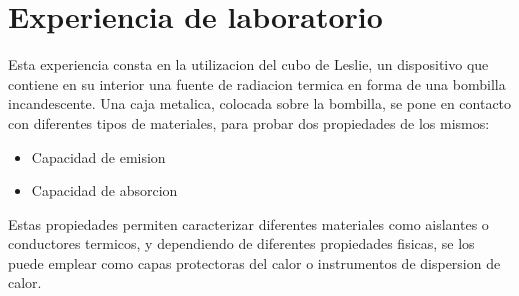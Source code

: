 \documentclass[12pt]{report}
\begin{document}
\chapter{Experiencia de laboratorio}
  Esta experiencia consta en la utilizacion del cubo de Leslie, un dispositivo que contiene en su interior una fuente
  de radiacion termica en forma de una bombilla incandescente. Una caja metalica, colocada sobre la bombilla, se pone
  en contacto con diferentes tipos de materiales, para probar dos propiedades de los mismos:
  \begin{itemize}
    \item Capacidad de emision
    \item Capacidad de absorcion
  \end{itemize}

  Estas propiedades permiten caracterizar diferentes materiales como aislantes o conductores termicos, y dependiendo de
  diferentes propiedades fisicas, se los puede emplear como capas protectoras del calor o instrumentos de dispersion de
  calor.
\end{document}
